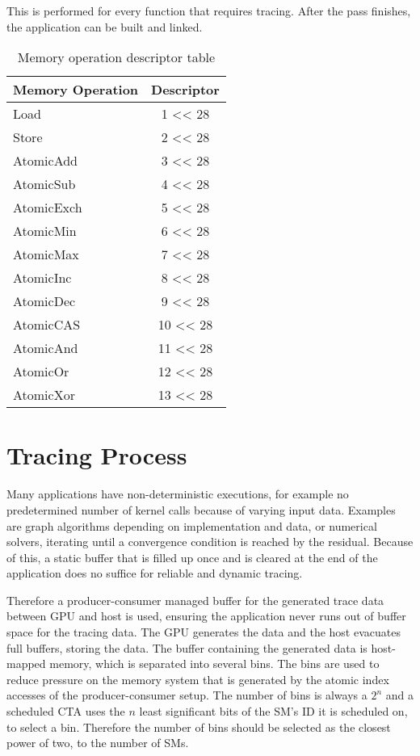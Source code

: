 This is performed for every function that requires tracing. After the pass finishes, the application can be built
and linked.
\begin{table}[t]
	\centering
\begin{tabular}{|l|c|}
	\hline 
	Memory Operation & Descriptor \\ 
	\hline 
	Load & 1 << 28 \\ 
	\hline 
	Store & 2 << 28 \\ 
	\hline 
	AtomicAdd & 3 << 28 \\ 
	\hline 
	AtomicSub & 4 << 28 \\ 
	\hline 
	AtomicExch & 5 << 28 \\ 
	\hline 
	AtomicMin & 6 << 28 \\ 
	\hline 
	AtomicMax & 7 << 28 \\ 
	\hline 
	AtomicInc & 8 << 28 \\ 
	\hline 
	AtomicDec & 9 << 28 \\ 
	\hline 
	AtomicCAS & 10 << 28 \\ 
	\hline 
	AtomicAnd & 11 << 28 \\ 
	\hline 
	AtomicOr & 12 << 28 \\ 
	\hline 
	AtomicXor & 13 << 28 \\ 
	\hline 
\end{tabular} 
 \label{TypeTab}
 \caption{Memory operation descriptor table}
\end{table}


\section{Tracing Process}\label{sec:prodcons}
	Many applications have non-deterministic executions, for example no predetermined number of kernel calls because of varying input data. Examples are graph algorithms depending on implementation and data, or numerical solvers, iterating until a
	convergence condition is reached by the residual. Because of this, a static buffer that is filled up once and is cleared at the end of the application does no suffice for reliable and dynamic tracing.
	
	Therefore a producer-consumer managed buffer for the generated trace data between GPU and host is used, ensuring the application never runs out of buffer space for the tracing data. The GPU generates the data and the host evacuates full buffers, storing the data.
	The buffer containing the generated data is host-mapped memory, which is separated into several bins. The bins are used to reduce
	pressure on the memory system that is generated by the atomic index accesses of the producer-consumer setup. The number of bins 
	is always a $2^n$ and a scheduled CTA uses the  $n$ least significant bits of the SM's ID it is scheduled on, to select a bin. Therefore the number of bins should be selected as the closest power of two, to the number of SMs.

